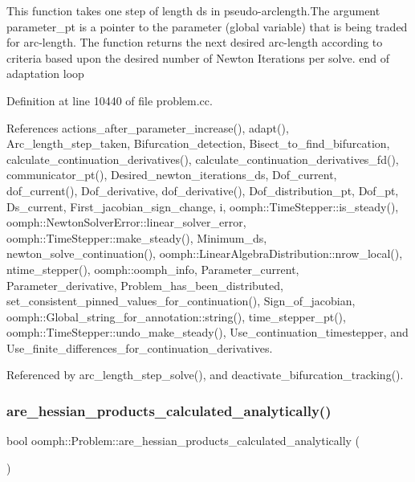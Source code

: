 This function takes one step of length ds in pseudo-\/arclength.\+The argument parameter\+\_\+pt is a pointer to the parameter (global variable) that is being traded for arc-\/length. The function returns the next desired arc-\/length according to criteria based upon the desired number of Newton Iterations per solve. end of adaptation loop 

Definition at line 10440 of file problem.\+cc.



References actions\+\_\+after\+\_\+parameter\+\_\+increase(), adapt(), Arc\+\_\+length\+\_\+step\+\_\+taken, Bifurcation\+\_\+detection, Bisect\+\_\+to\+\_\+find\+\_\+bifurcation, calculate\+\_\+continuation\+\_\+derivatives(), calculate\+\_\+continuation\+\_\+derivatives\+\_\+fd(), communicator\+\_\+pt(), Desired\+\_\+newton\+\_\+iterations\+\_\+ds, Dof\+\_\+current, dof\+\_\+current(), Dof\+\_\+derivative, dof\+\_\+derivative(), Dof\+\_\+distribution\+\_\+pt, Dof\+\_\+pt, Ds\+\_\+current, First\+\_\+jacobian\+\_\+sign\+\_\+change, i, oomph\+::\+Time\+Stepper\+::is\+\_\+steady(), oomph\+::\+Newton\+Solver\+Error\+::linear\+\_\+solver\+\_\+error, oomph\+::\+Time\+Stepper\+::make\+\_\+steady(), Minimum\+\_\+ds, newton\+\_\+solve\+\_\+continuation(), oomph\+::\+Linear\+Algebra\+Distribution\+::nrow\+\_\+local(), ntime\+\_\+stepper(), oomph\+::oomph\+\_\+info, Parameter\+\_\+current, Parameter\+\_\+derivative, Problem\+\_\+has\+\_\+been\+\_\+distributed, set\+\_\+consistent\+\_\+pinned\+\_\+values\+\_\+for\+\_\+continuation(), Sign\+\_\+of\+\_\+jacobian, oomph\+::\+Global\+\_\+string\+\_\+for\+\_\+annotation\+::string(), time\+\_\+stepper\+\_\+pt(), oomph\+::\+Time\+Stepper\+::undo\+\_\+make\+\_\+steady(), Use\+\_\+continuation\+\_\+timestepper, and Use\+\_\+finite\+\_\+differences\+\_\+for\+\_\+continuation\+\_\+derivatives.



Referenced by arc\+\_\+length\+\_\+step\+\_\+solve(), and deactivate\+\_\+bifurcation\+\_\+tracking().

\mbox{\label{classoomph_1_1Problem_af6235ced9e7e85324f785f2681ab3872}} 
\subsubsection{\texorpdfstring{are\+\_\+hessian\+\_\+products\+\_\+calculated\+\_\+analytically()}{are\_hessian\_products\_calculated\_analytically()}}
{\footnotesize\ttfamily bool oomph\+::\+Problem\+::are\+\_\+hessian\+\_\+products\+\_\+calculated\+\_\+analytically (\begin{DoxyParamCaption}{ }\end{DoxyParamCaption})\hspace{0.3cm}{\ttfamily [inline]}}



